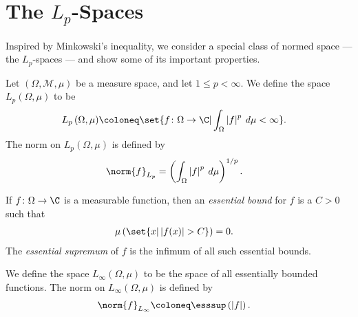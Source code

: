 \documentclass[10pt]{mypackage}
\begin{document}
\section{The $L_p$-Spaces}%
Inspired by Minkowski's inequality, we consider a special class of normed space --- the $L_p$-spaces --- and show some of its important properties.
\begin{definition}
  Let $\left( \Omega,\mathcal{M},\mu \right)$ be a measure space, and let $1 \leq p < \infty$. We define the space $L_p\left( \Omega,\mu \right)$ to be
  \begin{align*}
    L_p\left( \Omega,\mu \right) &\coloneq \set{f\colon \Omega\rightarrow \C | \int_{\Omega}^{} \left\vert f \right\vert^{p}\:d\mu < \infty}.
  \end{align*}
  The norm on $L_p\left( \Omega,\mu \right)$ is defined by
  \begin{align*}
    \norm{f}_{L_p} &= \left( \int_{\Omega}^{} \left\vert f \right\vert^{p}\:d\mu \right)^{1/p}.
  \end{align*}
\end{definition}
\begin{definition}
  If $f\colon \Omega\rightarrow \C$ is a measurable function, then an \textit{essential bound} for $f$ is a $C > 0$ such that
  \begin{align*}
    \mu\left( \set{x | \left\vert f(x) \right\vert > C} \right) &= 0.
  \end{align*}
  The \textit{essential supremum} of $f$ is the infimum of all such essential bounds.\newline

  We define the space $L_{\infty}\left( \Omega,\mu \right)$ to be the space of all essentially bounded functions. The norm on $L_{\infty}\left( \Omega,\mu \right)$ is defined by
  \begin{align*}
    \norm{f}_{L_{\infty}} &\coloneq \esssup\left( \left\vert f \right\vert \right).
  \end{align*}
\end{definition}
\end{document}

